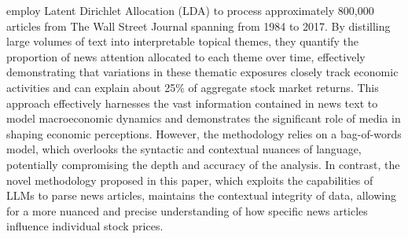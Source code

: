 \cite{bybee2021business} employ Latent Dirichlet Allocation (LDA) to process approximately 800,000 articles from The Wall Street Journal spanning from 1984 to 2017. By distilling large volumes of text into interpretable topical themes, they quantify the proportion of news attention allocated to each theme over time, effectively demonstrating that variations in these thematic exposures closely track economic activities and can explain about 25\% of aggregate stock market returns. This approach effectively harnesses the vast information contained in news text to model macroeconomic dynamics and demonstrates the significant role of media in shaping economic perceptions. However, the methodology relies on a bag-of-words model, which overlooks the syntactic and contextual nuances of language, potentially compromising the depth and accuracy of the analysis. In contrast, the novel methodology proposed in this paper, which exploits the capabilities of LLMs to parse news articles, maintains the contextual integrity of data, allowing for a more nuanced and precise understanding of how specific news articles influence individual stock prices.



